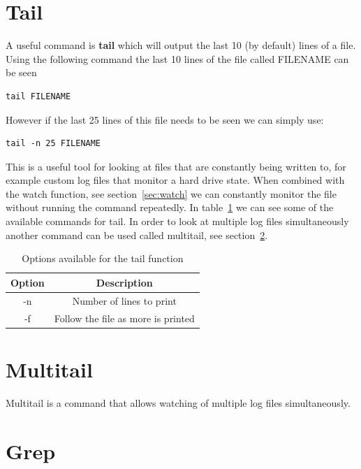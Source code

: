 \section{Tail}
\label{sec:tail}

A useful command is \textbf{tail} which will output the last 10 (by default) lines of a file.  Using the following command the last 10 lines of the file called FILENAME can be seen

\begin{lstlisting}
tail FILENAME
\end{lstlisting}

However if the last 25 lines of this file needs to be seen we can simply use:

\begin{lstlisting}
tail -n 25 FILENAME
\end{lstlisting}

This is a useful tool for looking at files that are constantly being written to, for example custom log files that monitor a hard drive state.  When combined with the watch function, see section~\ref{sec:watch} we can constantly monitor the file without running the command repeatedly.  In table~\ref{tab:tail} we can see some of the available commands for tail.  In order to look at multiple log files simultaneously another command can be used called multitail, see section~\ref{sec:multitail}.

\begin{table}[!th]
\centering
\begin{tabular}{cc}
\hline
Option & Description\\
\hline
-n & Number of lines to print\\
-f & Follow the file as more is printed\\
\hline
\end{tabular}
\caption{Options available for the tail function}
\label{tab:tail}
\end{table}

\section{Multitail}
\label{sec:multitail}

Multitail is a command that allows watching of multiple log files simultaneously.


\section{Grep}
\label{sec:grep}


